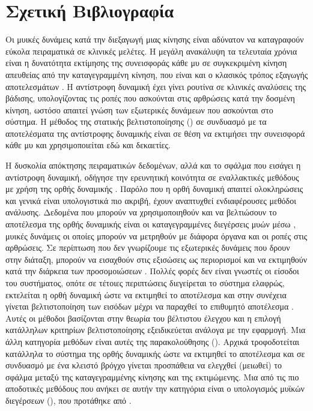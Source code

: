 \section{Σχετική Βιβλιογραφία}

Οι μυικές δυνάμεις κατά την διεξαγωγή μιας κίνησης είναι αδύνατον να καταγραφούν εύκολα πειραματικά σε κλινικές μελέτες. Η μεγάλη ανακάλυψη τα τελευταία χρόνια είναι η δυνατότητα εκτίμησης της συνεισφοράς κάθε μυ σε συγκεκριμένη κίνηση απευθείας από την καταγεγραμμένη κίνηση, που είναι και ο κλασικός τρόπος εξαγωγής αποτελεσμάτων \cite{hamner10, mclean03}. Η αντίστροφη δυναμική έχει γίνει ρουτίνα σε κλινικές αναλύσεις της βάδισης, υπολογίζοντας τις ροπές που ασκούνται στις αρθρώσεις κατά την δοσμένη κίνηση, ωστόσο απαιτεί γνώση των εξωτερικές δυνάμεων που ασκούνται στο σύστημα. Η μέθοδος της στατικής βελτιστοποίησης () σε συνδυασμό με τα αποτελέσματα της αντίστροφης δυναμικής είναι σε θέση να εκτιμήσει την συνεισφορά κάθε μυ \cite{heintz06, erdemir07} και χρησιμοποιείται εδώ και δεκαετίες.

Η δυσκολία απόκτησης πειραματικών δεδομένων, αλλά και το σφάλμα που εισάγει η αντίστροφη δυναμική, οδήγησε την ερευνητική κοινότητα σε εναλλακτικές μεθόδους με χρήση της ορθής δυναμικής \cite{buchanan04}. Παρόλο που η ορθή δυναμική απαιτεί ολοκληρώσεις και γενικά είναι υπολογιστικά πιο ακριβή, έχουν αναπτυχθεί ενδιαφέρουσες μεθόδοι ανάλυσης. Δεδομένα που μπορούν να χρησιμοποιηθούν και να βελτιώσουν το αποτέλεσμα της ορθής δυναμικής είναι οι καταγεγραμμένες διεγέρσεις μυών μέσω , μυικές δυνάμεις οι οποίες μπορούν να μετρηθούν με διάφορα όργανα και οι ροπές στις αρθρώσεις. Σε περίπτωση που δεν γνωρίζουμε τις εξωτερικές δυνάμεις που δρουν στην διάταξη, μπορούν να εισαχθούν στις εξισώσεις ως περιορισμοί και να εκτιμηθούν κατά την διάρκεια των προσομοιώσεων \cite{hamner10, seitha11}. Πολλές φορές δεν είναι γνωστές οι είσοδοι του συστήματος, οπότε σε τέτοιες περιπτώσεις διεγείρεται το σύστημα ελαφρώς, εκτελείται η ορθή δυναμική ώστε να εκτιμηθεί το αποτέλεσμα και στην συνέχεια γίνεται βελτιστοποίηση των εισόδων μέχρι να παραχθεί το επιθυμητό αποτέλεσμα \cite{pandy01}. Αυτές οι μέθοδοι βασίζονται στην θεωρία του βέλτιστου έλεγχου και η επιλογή κατάλληλων κριτηρίων βελτιστοποίησης εξειδικεύεται ανάλογα με την εφαρμογή. Μια άλλη κατηγορία μεθόδων είναι αυτές της παρακολούθησης (). Αρχικά τροφοδοτείται κατάλληλα το σύστημα της ορθής δυναμικής ώστε να εκτιμηθεί το αποτέλεσμα και σε συνδυασμό με ένα κλειστό βρόγχο γίνεται προσπάθεια να ελεγχθεί (μειωθεί) το σφάλμα μεταξύ της καταγεγραμμένης κίνησης και της εκτιμώμενης. Μια από τις πιο αποδοτικές μεθόδους που ανήκει σε αυτήν την κατηγόρια είναι ο υπολογισμός μυϊκών διεγέρσεων (), που προτάθηκε από \cite{thelen06}.

